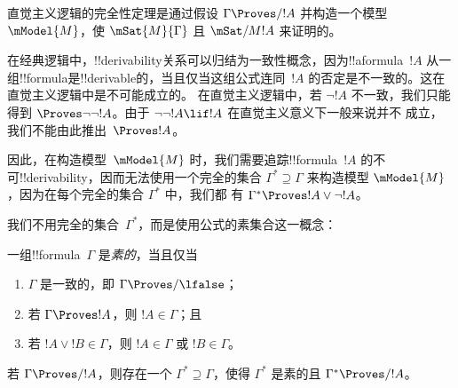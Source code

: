 \documentclass[../../../include/open-logic-section]{subfiles}
\begin{document}


直觉主义逻辑的完全性定理是通过假设 $\Gamma \Proves/ !A$
并构造一个模型 $\mModel{M}$，使 $\mSat{M}{\Gamma}$ 且 $\mSat/{M}{!A}$ 来证明的。

在经典逻辑中，!!{derivability}关系可以归结为一致性概念，因为!!a{formula}~$!A$ 从一组!!{formula}是!!{derivable}的，当且仅当这组公式连同~$!A$
的否定是不一致的。这在直觉主义逻辑中是不可能成立的。
在直觉主义逻辑中，若 $\lnot!A$ 不一致，我们只能得到
$\Proves \lnot\lnot !A$。由于 $\lnot\lnot!A \lif !A$ 在直觉主义意义下一般来说并不
成立，我们不能由此推出~$\Proves !A$。

因此，在构造模型~$\mModel{M}$ 时，我们需要追踪!!{formula}~$!A$
的不可!!{derivability}，因而无法使用一个完全的集合
$\Gamma^* \supseteq \Gamma$ 来构造模型 $\mModel{M}$，因为在每个完全的集合
$\Gamma^*$ 中，我们都
有 $\Gamma^* \Proves !A \lor \lnot !A$。

我们不用完全的集合~$\Gamma^*$，而是使用公式的素集合这一概念：

\begin{defn}
  一组!!{formula}~$\Gamma$ 是\emph{素的}，当且仅当
  \begin{enumerate}
  \item{} $\Gamma$ 是一致的，即 $\Gamma \Proves/ \lfalse$；
  \item{} 若 $\Gamma \Proves !A$，则 $!A \in \Gamma$；且
  \item{} 若 $!A \lor !B \in \Gamma$，则 $!A \in
    \Gamma$ 或 $!B \in \Gamma$。
  \end{enumerate}
\end{defn}

\begin{lem}
   若 $\Gamma \Proves/ !A$，则存在一个
  $\Gamma^* \supseteq \Gamma$，使得 $\Gamma^*$ 是素的且
  $\Gamma^* \Proves/ !A$。
\end{lem}
\end{document}
